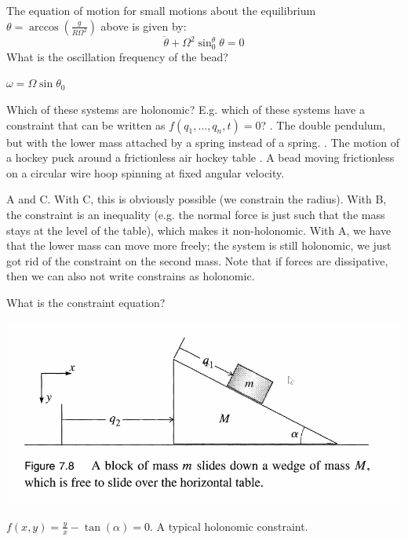 \begin{p}
The equation of motion for small motions about the equilibrium $\theta = \arccos(\frac{g}{R\Omega^2})$ above is given by:
\[\ddot{\theta} +\Omega^2\sin^\theta_0\theta = 0\]
What is the oscillation frequency of the bead?
\end{p}
\begin{s}
$\omega = \Omega\sin\theta_0$
\end{s}

\begin{p}
Which of these systems are holonomic? E.g. which of these systems have a constraint that can be written as $f(q_1, \ldots, q_n, t) = 0$?
. The double pendulum, but with the lower mass attached by a spring instead of a spring.
. The motion of a hockey puck around a frictionless air hockey table
. A bead moving frictionless on a circular wire hoop spinning at fixed angular velocity.
\end{p}
\begin{s}
A and C. With C, this is obviously possible (we constrain the radius). With B, the constraint is an inequality (e.g. the normal force is just such that the mass stays at the level of the table), which makes it non-holonomic. With A, we have that the lower mass can move more freely; the system is still holonomic, we just got rid of the constraint on the second mass. Note that if forces are dissipative, then we can also not write constrains as holonomic.
\end{s}

\begin{p}
What is the constraint equation?
\begin{center}
    \includegraphics[scale=0.75]{Lecture-13/w13-img1.png}
\end{center}
\end{p}
\begin{s}
$f(x,y) = \frac{y}{x} - \tan(\alpha) = 0$. A typical holonomic constraint.
\end{s}

